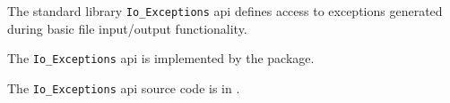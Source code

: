 
The standard library {\tt Io\_Exceptions} api defines access to exceptions generated during basic file input/output functionality.

The {\tt Io\_Exceptions} api is implemented by the  package.

The {\tt Io\_Exceptions} api source code is in .






